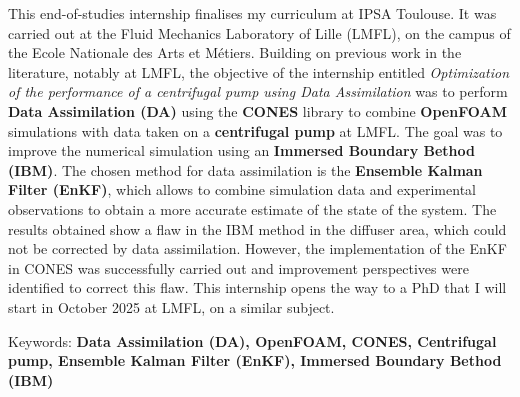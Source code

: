 This end-of-studies internship finalises my curriculum at IPSA Toulouse.
It was carried out at the Fluid Mechanics Laboratory of Lille (LMFL), on the campus of the Ecole Nationale des Arts et Métiers. Building on previous work in the literature, notably at LMFL, the objective of the internship entitled \textit{Optimization of the performance of a centrifugal pump using Data Assimilation} was to perform \textbf{Data Assimilation (DA)} using the \textbf{CONES} library to combine \textbf{OpenFOAM} simulations with data taken on a \textbf{centrifugal pump} at LMFL. The goal was to improve the numerical simulation using an \textbf{Immersed Boundary Bethod (IBM)}. The chosen method for data assimilation is the \textbf{Ensemble Kalman Filter (EnKF)}, which allows to combine simulation data and experimental observations to obtain a more accurate estimate of the state of the system. The results obtained show a flaw in the IBM method in the diffuser area, which could not be corrected by data assimilation. However, the implementation of the EnKF in CONES was successfully carried out and improvement perspectives were identified to correct this flaw.
This internship opens the way to a PhD that I will start in October 2025 at LMFL, on a similar subject.     

Keywords: \textbf{Data Assimilation (DA), OpenFOAM, CONES, Centrifugal pump, Ensemble Kalman Filter (EnKF), Immersed Boundary Bethod (IBM)}

